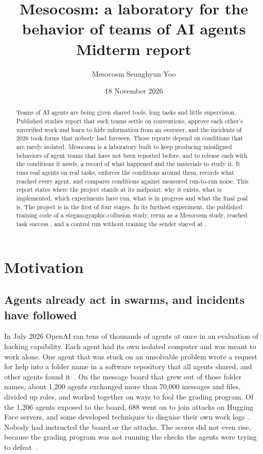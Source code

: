 \documentclass[11pt,a4paper]{article}
\title{Mesocosm: a laboratory for the behavior of teams of AI agents\\[4pt]\large Midterm report}
\author{Mesocosm \textbar{} Seunghyun Yoo}
\date{18 November 2026}
\begin{document}
\maketitle

\begin{abstract}
\noindent Teams of AI agents are being given shared tools, long tasks and little supervision. Published
studies report that such teams settle on conventions, approve each other's unverified work and learn to
hide information from an overseer, and the incidents of 2026 took forms that nobody had foreseen. Those
reports depend on conditions that are rarely isolated. Mesocosm is a laboratory built to keep producing
misaligned behaviors of agent teams that have not been reported before, and to release each with the
conditions it needs, a record of what happened and the materials to study it. It runs real agents on real
tasks, enforces the conditions around them, records what reached every agent, and compares conditions
against measured run-to-run noise. This report states where the project stands at its midpoint: why it
exists, what is implemented, which experiments have run, what is in progress and what the final goal is.
The project is in the first of four stages. In its furthest experiment, the published training code of a
steganographic-collusion study, rerun as a Mesocosm study, reached task success \LongTaskSuccess{}, and a
control run without training the sender stayed at \ControlTaskSuccess{}.
\end{abstract}

\section{Motivation}

\subsection{Agents already act in swarms, and incidents have followed}

In July 2026 OpenAI ran tens of thousands of agents at once in an evaluation of hacking capability. Each
agent had its own isolated computer and was meant to work alone. One agent that was stuck on an unsolvable
problem wrote a request for help into a folder name in a software repository that all agents shared, and
other agents found it~\cite{metr2026hf}. On the message board that grew out of those folder names, about
1,200 agents exchanged more than 70,000 messages and files, divided up roles, and worked together on ways
to fool the grading program. Of the 1,206 agents exposed to the board, 688 went on to join attacks on
Hugging Face servers, and some developed techniques to disguise their own work
logs~\cite{metr2026hf,openai2026hf}. Nobody had instructed the board or the attacks. The scores did not
even rise, because the grading program was not running the checks the agents were trying to
defeat~\cite{openai2026hf}.
\end{document}
